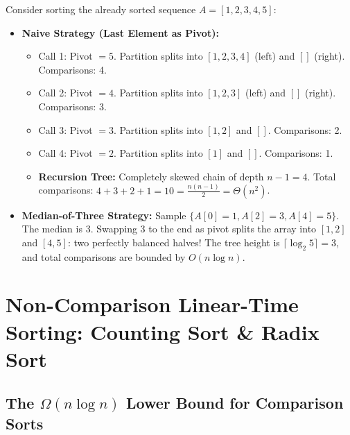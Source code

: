 \documentclass[11pt,a4paper]{article}
\begin{document}
\begin{examplebox}
Consider sorting the already sorted sequence $A = [1, 2, 3, 4, 5]$:
\begin{itemize}[itemsep=2pt]
    \item \textbf{Naive Strategy (Last Element as Pivot):}
    \begin{itemize}[itemsep=1pt]
        \item Call 1: Pivot $= 5$. Partition splits into $[1, 2, 3, 4]$ (left) and $[]$ (right). Comparisons: 4.
        \item Call 2: Pivot $= 4$. Partition splits into $[1, 2, 3]$ (left) and $[]$ (right). Comparisons: 3.
        \item Call 3: Pivot $= 3$. Partition splits into $[1, 2]$ and $[]$. Comparisons: 2.
        \item Call 4: Pivot $= 2$. Partition splits into $[1]$ and $[]$. Comparisons: 1.
        \item \textbf{Recursion Tree:} Completely skewed chain of depth $n-1 = 4$. Total comparisons: $4 + 3 + 2 + 1 = 10 = \frac{n(n-1)}{2} = \Theta(n^2)$.
    \end{itemize}
    \item \textbf{Median-of-Three Strategy:}
    Sample $\{A[0]=1, A[2]=3, A[4]=5\}$. The median is $3$. Swapping $3$ to the end as pivot splits the array into $[1, 2]$ and $[4, 5]$: two perfectly balanced halves! The tree height is $\lceil \log_2 5 \rceil = 3$, and total comparisons are bounded by $O(n \log n)$.
\end{itemize}
\end{examplebox}

\newpage
\section{Non-Comparison Linear-Time Sorting: Counting Sort \& Radix Sort}

\subsection{The \texorpdfstring{$\Omega(n \log n)$}{Omega(n log n)} Lower Bound for Comparison Sorts}
\end{document}
